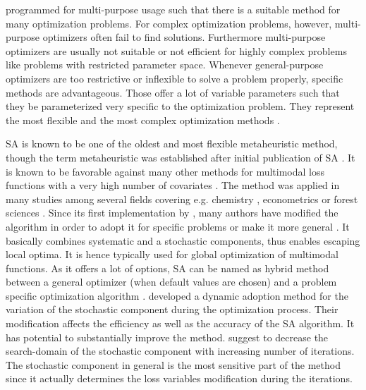 programmed for multi-purpose usage such that there is a suitable method for many optimization problems. For complex optimization problems, however, multi-purpose optimizers often fail to find solutions. Furthermore multi-purpose optimizers are usually not suitable or not efficient for highly complex problems like problems with restricted parameter space. Whenever general-purpose optimizers are too restrictive or inflexible to solve a problem properly, specific methods are advantageous. Those offer a lot of variable parameters such that they be parameterized very specific to the optimization problem. They represent the most flexible and the most complex optimization methods \citep{blum_2003}.

SA \citep{kirkpatrick_1983} is known to be one of the oldest and most flexible metaheuristic method, though the term metaheuristic was established after initial publication of SA \citep{blum_2003}. It is known to be favorable against many other methods for multimodal loss functions with a very high number of covariates \citep{corana_1987}. The method was applied in many studies among several fields covering e.g. chemistry \citep{agostini_2006}, econometrics \citep{ingber_1993} or forest sciences \citep{baskent_2002, boston_1999}. Since its first implementation by \citet{kirkpatrick_1983}, many authors have modified the algorithm in order to adopt it for specific problems \citep[e.g.][]{desarbo_1989, goffe_1996} or make it more general \citep[e.g.][]{xiang_2013}. It basically combines systematic and a stochastic components, thus enables escaping local optima. It is hence typically used for global optimization of multimodal functions. As it offers a lot of options, SA can be named as hybrid method between a general optimizer (when default values are chosen) and a problem specific optimization algorithm \citep{wegener_2005}. \citet{corana_1987} developed a dynamic adoption method for the variation of the stochastic component during the optimization process. Their modification affects the efficiency as well as the accuracy of the SA algorithm. It has potential to substantially improve the method. \citet{pronzato_1984} suggest to decrease the search-domain of the stochastic component with increasing number of iterations. The stochastic component in general is the most sensitive part of the method since it actually determines the loss variables modification during the iterations.

